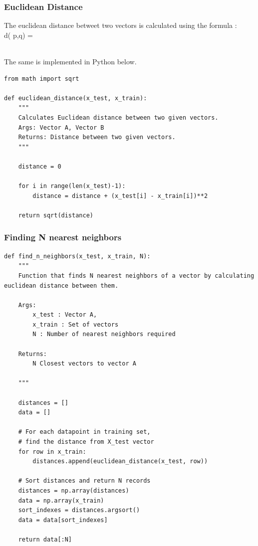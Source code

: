 \documentclass[letterpaper, 28pt, fleqn]{article}
\begin{document}
\pagebreak

\subsubsection{Euclidean Distance}

The euclidean distance betweet two vectors is calculated using the formula : \\ 

 d\left( p,q\right)   =  

\\ The same is implemented in Python below.

\begin{lstlisting}
from math import sqrt

def euclidean_distance(x_test, x_train):
    """
    Calculates Euclidean distance between two given vectors.
    Args: Vector A, Vector B
    Returns: Distance between two given vectors.
    """
    
    distance = 0
    
    for i in range(len(x_test)-1):
        distance = distance + (x_test[i] - x_train[i])**2

    return sqrt(distance)
\end{lstlisting}

\subsubsection{Finding N nearest neighbors}

\begin{lstlisting}
def find_n_neighbors(x_test, x_train, N):
    """
    Function that finds N nearest neighbors of a vector by calculating euclidean distance between them.
    
    Args: 
        x_test : Vector A, 
        x_train : Set of vectors
        N : Number of nearest neighbors required
        
    Returns:
        N Closest vectors to vector A
        
    """
    
    distances = []
    data = []
    
    # For each datapoint in training set,
    # find the distance from X_test vector
    for row in x_train:
        distances.append(euclidean_distance(x_test, row))
  
    # Sort distances and return N records
    distances = np.array(distances)
    data = np.array(x_train)
    sort_indexes = distances.argsort()             
    data = data[sort_indexes]  
    
    return data[:N]               
\end{lstlisting}
\end{document}
